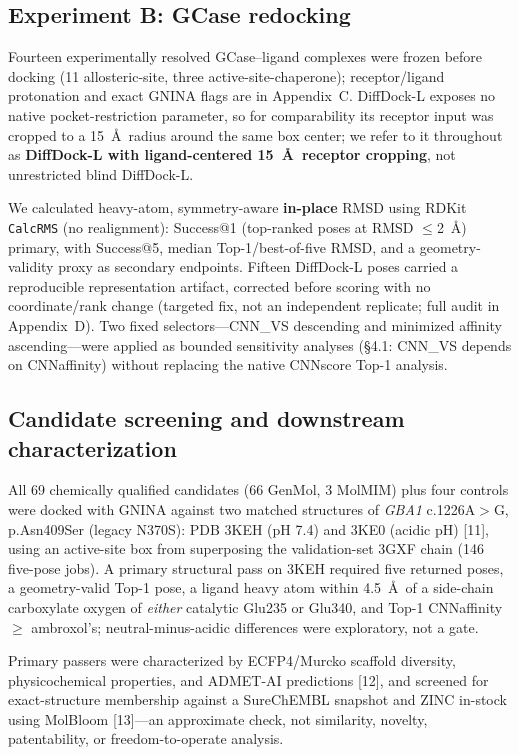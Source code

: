 \documentclass{article}
\begin{document}
\subsection{Experiment B: GCase redocking}

Fourteen experimentally resolved GCase--ligand complexes were frozen before docking (11 allosteric-site, three active-site-chaperone); receptor/ligand protonation and exact GNINA flags are in Appendix~C. DiffDock-L exposes no native pocket-restriction parameter, so for comparability its receptor input was cropped to a 15~\AA\ radius around the same box center; we refer to it throughout as \textbf{DiffDock-L with ligand-centered 15~\AA\ receptor cropping}, not unrestricted blind DiffDock-L.

We calculated heavy-atom, symmetry-aware \textbf{in-place} RMSD using RDKit \texttt{CalcRMS} (no realignment): Success@1 (top-ranked poses at RMSD $\leq$2~\AA) primary, with Success@5, median Top-1/best-of-five RMSD, and a geometry-validity proxy as secondary endpoints. Fifteen DiffDock-L poses carried a reproducible representation artifact, corrected before scoring with no coordinate/rank change (targeted fix, not an independent replicate; full audit in Appendix~D). Two fixed selectors---CNN\_VS descending and minimized affinity ascending---were applied as bounded sensitivity analyses (\S4.1: CNN\_VS depends on CNNaffinity) without replacing the native CNNscore Top-1 analysis.

\subsection{Candidate screening and downstream characterization}

All 69 chemically qualified candidates (66 GenMol, 3 MolMIM) plus four controls were docked with GNINA against two matched structures of \textit{GBA1} c.1226A$>$G, p.Asn409Ser (legacy N370S): PDB 3KEH (pH 7.4) and 3KE0 (acidic pH) [11], using an active-site box from superposing the validation-set 3GXF chain (146 five-pose jobs). A primary structural pass on 3KEH required five returned poses, a geometry-valid Top-1 pose, a ligand heavy atom within 4.5~\AA\ of a side-chain carboxylate oxygen of \emph{either} catalytic Glu235 or Glu340, and Top-1 CNNaffinity $\geq$ ambroxol's; neutral-minus-acidic differences were exploratory, not a gate.

Primary passers were characterized by ECFP4/Murcko scaffold diversity, physicochemical properties, and ADMET-AI predictions [12], and screened for exact-structure membership against a SureChEMBL snapshot and ZINC in-stock using MolBloom [13]---an approximate check, not similarity, novelty, patentability, or freedom-to-operate analysis.
\end{document}
